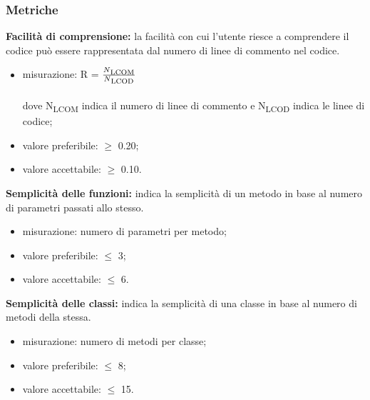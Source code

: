 \subsubsection{Metriche}
\textbf{Facilità di comprensione:} la facilità con cui l'utente riesce a comprendere il codice può essere rappresentata dal numero di linee di 
commento nel codice.
\begin{itemize}
    \item misurazione: R = $\frac{N\textsubscript{LCOM}}{N\textsubscript{LCOD}}$ \\
    \\dove N\textsubscript{LCOM} indica il numero di linee di commento e N\textsubscript{LCOD} indica le linee di codice;
    \item valore preferibile: $\geq$ 0.20;
    \item valore accettabile: $\geq$ 0.10.
\end{itemize}
\textbf{Semplicità delle funzioni:} indica la semplicità di un metodo in base al numero di parametri passati allo stesso.
\begin{itemize}
    \item misurazione: numero di parametri per metodo;
    \item valore preferibile: $\leq$ 3;
    \item valore accettabile: $\leq$ 6.
\end{itemize}
\textbf{Semplicità delle classi:} indica la semplicità di una classe in base al numero di metodi della stessa.
\begin{itemize}
    \item misurazione: numero di metodi per classe;
    \item valore preferibile: $\leq$ 8;
    \item valore accettabile: $\leq$ 15.
\end{itemize}

